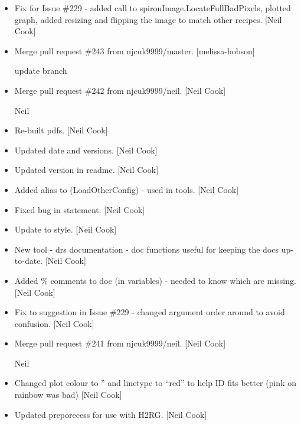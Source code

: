 \documentclass[a4paper,10pt,english]{report}
\begin{document}
\begin{itemize}
\item {} 
Fix for Issue \#229 - added call to
spirouImage.LocateFullBadPixels, plotted graph, added resizing
and flipping the image to match other recipes. {[}Neil Cook{]}

\item {} 
Merge pull request \#243 from njcuk9999/master. {[}melissa-hobson{]}

update branch

\item {} 
Merge pull request \#242 from njcuk9999/neil. {[}Neil Cook{]}

Neil

\item {} 
Re-built pdfs. {[}Neil Cook{]}

\item {} 
Updated date and versions. {[}Neil Cook{]}

\item {} 
Updated version in readme. {[}Neil Cook{]}

\item {} 
Added alias to  (LoadOtherConfig) - used in
tools. {[}Neil Cook{]}

\item {} 
Fixed bug in  statement. {[}Neil Cook{]}

\item {} 
Update to style. {[}Neil Cook{]}

\item {} 
New tool - drs documentation - doc functions useful for keeping the
docs up-to-date. {[}Neil Cook{]}

\item {} 
Added \% comments to doc (in variables) - needed to know which are
missing. {[}Neil Cook{]}

\item {} 
Fix to suggestion in Issue \#229 - changed argument order around to
avoid confusion. {[}Neil Cook{]}

\item {} 
Merge pull request \#241 from njcuk9999/neil. {[}Neil Cook{]}

Neil

\item {} 
Changed plot colour to ” and linetype to “red” to help ID
fits better (pink on rainbow was bad) {[}Neil Cook{]}

\item {} 
Updated preporecess for use with H2RG. {[}Neil Cook{]}


\end{itemize}
\end{document}
